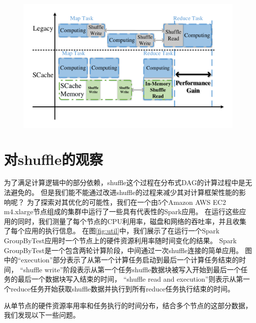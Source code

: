 \begin{figure}[!htp]
	\centering
	\includegraphics[width=\textwidth]{../../PPoPP-2018/fig/workflow.pdf}
\end{figure}

\section{对shuffle的观察}

为了满足计算逻辑中的部分依赖，shuffle这个过程在分布式DAG的计算过程中是无法避免的。
但是我们能不能通过改进shuffle的过程来减少其对计算框架性能的影响呢？
为了探索对其优化的可能性，我们在一个由5个Amazon AWS EC2 m4.xlarge\cite{aws}节点组成的集群中运行了一些具有代表性的Spark应用。
在运行这些应用的同时，我们测量了每个节点的CPU利用率，磁盘和网络的吞吐率，并且收集了每个应用的执行信息。
在图\ref{fig:util}中，我们展示了在运行一个Spark GroupByTest应用时一个节点上的硬件资源利用率随时间变化的结果。
Spark GroupByTest是一个包含两轮计算阶段，中间通过一次shuffle连接的简单应用。
图中的“execution”部分表示了从第一个计算任务启动到最后一个计算任务结束的时间，
“shuffle write”阶段表示从第一个任务shuffle数据块被写入开始到最后一个任务的最后一个数据块写入结束的时间，
“shuffle read and execution”则表示从第一个reduce任务开始获取shuffle数据并执行到所有reduce任务执行结束的时间。

从单节点的硬件资源率用率和任务执行的时间分布，结合多个节点的这部分数据，我们发现以下一些问题。

